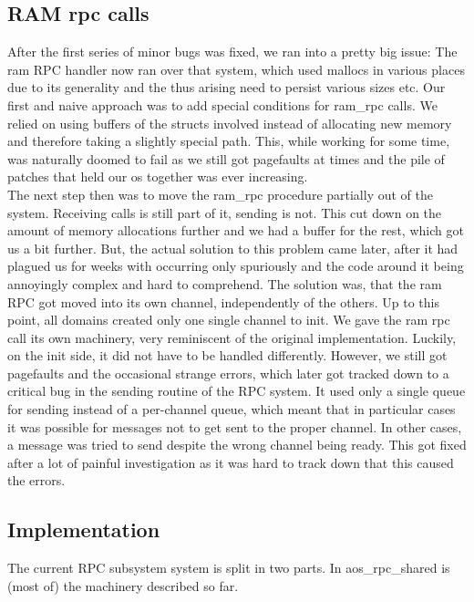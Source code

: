 \subsection{RAM rpc calls\label{ss:rpc_ram}}
After the first series of minor bugs 
was fixed, we ran into a pretty big issue: The ram RPC handler now ran over 
that system, which used mallocs in various places due to its generality and 
the thus arising need to persist various sizes etc.
Our first and naive approach was to add special 
conditions for ram\_rpc calls. We relied on using buffers of the 
structs involved instead of allocating new memory and therefore taking a slightly special path. 
This, while working for some time, was naturally doomed to fail as we still got 
pagefaults at times and the pile of patches that held our os together was 
ever increasing.\\
\medskip
The next step then was to move the ram\_rpc procedure partially out of the system. 
Receiving calls is still part of it, sending is not. This cut down on the amount of memory allocations 
further and we had a buffer for the rest, which got us a bit 
further. But, the actual solution to this problem came later, after it 
had plagued us for weeks with occurring only spuriously and the code around it 
being annoyingly complex and hard to comprehend.
The solution was, that the ram RPC got moved into its own channel, 
independently of the others. Up to this point, all domains created only one single
channel to init. We gave the ram rpc call its own machinery, very reminiscent of the original 
implementation. Luckily, on the init side, it did not have to be handled 
differently.
However, we still got pagefaults and the occasional strange errors, which 
later got tracked down to a critical bug in the sending routine of the RPC system. It used 
only a single queue for sending instead of a per-channel queue, which meant 
that in particular cases it was possible for messages not to get sent to the 
proper channel. In other cases, a message was tried to send despite the wrong channel being ready. This got fixed after a lot of painful investigation as it 
was hard to track down that this caused the errors.

\subsection{Implementation \label{ss:rpc_implementation}}
The current RPC subsystem system is split in two parts. In 
aos\_rpc\_shared is (most of) the machinery described so far.
\medskip

